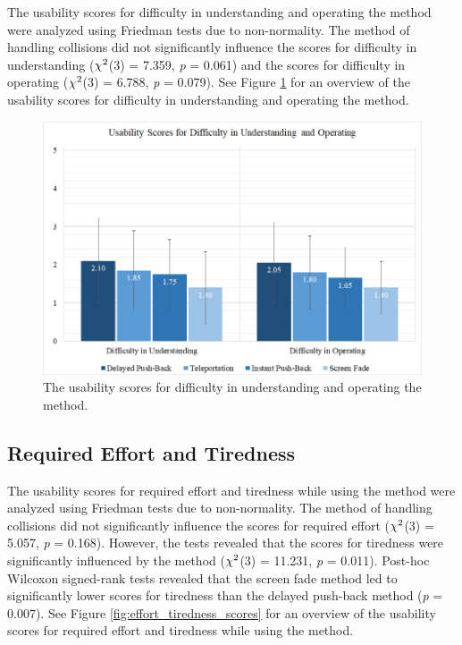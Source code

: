 The usability scores for difficulty in understanding and operating the method were analyzed using Friedman tests due to non-normality. The method of handling collisions did not significantly influence the scores for difficulty in understanding (\textit{$\chi\textsuperscript{2}$}(3) = 7.359, \textit{p} = 0.061) and the scores for difficulty in operating (\textit{$\chi\textsuperscript{2}$}(3) = 6.788, \textit{p} = 0.079). See Figure \ref{fig:difficulty_scores} for an overview of the usability scores for difficulty in understanding and operating the method.

\begin{figure}[th]
\centering
\includegraphics[width=1\textwidth]{img/difficulty_scores.png}
\caption{The usability scores for difficulty in understanding and operating the method.}
\label{fig:difficulty_scores}
\end{figure}

\subsection{Required Effort and Tiredness}

The usability scores for required effort and tiredness while using the method were analyzed using Friedman tests due to non-normality. The method of handling collisions did not significantly influence the scores for required effort (\textit{$\chi\textsuperscript{2}$}(3) = 5.057, \textit{p} = 0.168). However, the tests revealed that the scores for tiredness were significantly influenced by the method (\textit{$\chi\textsuperscript{2}$}(3) = 11.231, \textit{p} = 0.011). Post-hoc Wilcoxon signed-rank tests revealed that the screen fade method led to significantly lower scores for tiredness than the delayed push-back method (\textit{p} = 0.007). See Figure \ref{fig:effort_tiredness_scores} for an overview of the usability scores for required effort and tiredness while using the method.

